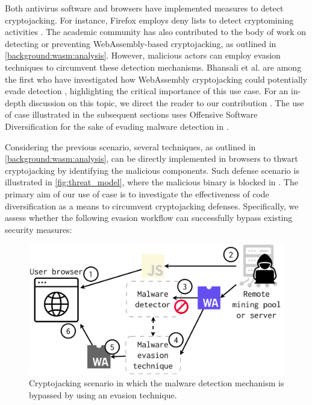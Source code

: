 Both antivirus software and browsers have implemented measures to detect cryptojacking. For instance, Firefox employs deny lists to detect cryptomining activities \cite{firefoxcrypto}. 
The academic community has also contributed to the body of work on detecting or preventing WebAssembly-based cryptojacking, as outlined in \autoref{background:wasm:analysis}. 
However, malicious actors can employ evasion techniques to circumvent these detection mechanisms. 
Bhansali et al. are among the first who have investigated how WebAssembly cryptojacking could potentially evade detection \cite{10.1145/3507657.3528560}, highlighting the critical importance of this use case. 
For an in-depth discussion on this topic, we direct the reader to our contribution \cite{EVASION}.
The use of case illustrated in the subsequent sections uses Offensive Software Diversification for the sake of evading malware detection in \Wasm. 

\label{threat_model}


Considering the previous scenario, several techniques, as outlined in \autoref{background:wasm:analysis}, can be directly implemented in browsers to thwart cryptojacking by identifying the malicious \Wasm components. 
Such defense scenario is illustrated in \autoref{fig:threat_model}, where the \Wasm malicious binary is blocked in .
The primary aim of our use of case is to investigate the effectiveness of code diversification as a means to circumvent cryptojacking defenses. 
Specifically, we assess whether the following evasion workflow can successfully bypass existing security measures:

\begin{figure}
    \centering
    \includegraphics[width=0.8\linewidth]{figures/threat_model.pdf}
    \caption{Cryptojacking scenario in which the malware detection mechanism is bypassed by using an evasion technique.}
    \label{fig:threat_model}
\end{figure}


